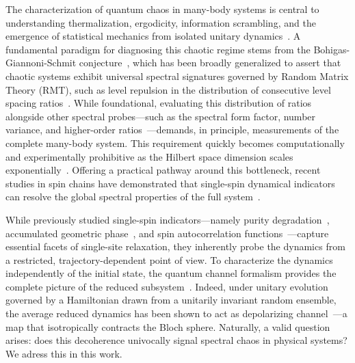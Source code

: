\documentclass[pra,twocolumn,aps,showpacs,superscriptaddress,longbibliography]{revtex4-2}%
\begin{document}
The characterization of quantum chaos in many-body systems is central to understanding thermalization, ergodicity, information scrambling, and the emergence of statistical mechanics from isolated unitary dynamics~\cite{dalessio_2016_quantum}. A fundamental paradigm for diagnosing this chaotic regime stems from the Bohigas-Giannoni-Schmit conjecture~\cite{bohigas_1984_characterization}, which has been broadly generalized to assert that chaotic systems exhibit universal spectral signatures governed by Random Matrix Theory (RMT), such as level repulsion in the distribution of consecutive level spacing ratios~\cite{oganesyan_2007_localization, atas_2013_distribution}. 
While foundational, evaluating this distribution of ratios alongside other spectral probes---such as the spectral form factor, number variance, and higher-order ratios~\cite{mehta_2004_random,tekur_2020_symmetry,haake_2001_quantum}---demands, in principle, measurements of the complete many-body system. This requirement quickly becomes computationally and experimentally prohibitive as the Hilbert space dimension scales exponentially~\cite{roushan2017spectroscopic, dong_2025_measuring}.
Offering a practical pathway around this bottleneck, recent studies in spin chains have demonstrated that single-spin dynamical indicators can resolve the global spectral properties of the full system~\cite{mirkin_2021_quantum, mirkin_2021_sensing, vallejo-fabila_2025_singlesite}.

While previously studied single-spin indicators---namely purity degradation~\cite{mirkin_2021_quantum}, accumulated geometric phase~\cite{mirkin_2021_sensing}, and spin autocorrelation functions~\cite{vallejo-fabila_2025_singlesite}---capture essential facets of single-site relaxation, they inherently probe the dynamics from a restricted, trajectory-dependent point of view. To characterize the dynamics independently of the initial state, the quantum channel formalism provides the complete picture of the reduced subsystem~\cite{breuer_2002_theory,nielsen_2010_quantum,bengtsson_2006_geometry}. Indeed, under unitary evolution governed by a Hamiltonian drawn from a unitarily invariant random ensemble, the average reduced dynamics has been shown to act as depolarizing channel~\cite{znidaric_2011_nonmarkovian}---a map that isotropically contracts the Bloch sphere. Naturally, a valid question arises: does this decoherence univocally signal spectral chaos in physical systems? We adress this in this work.  
\end{document}
